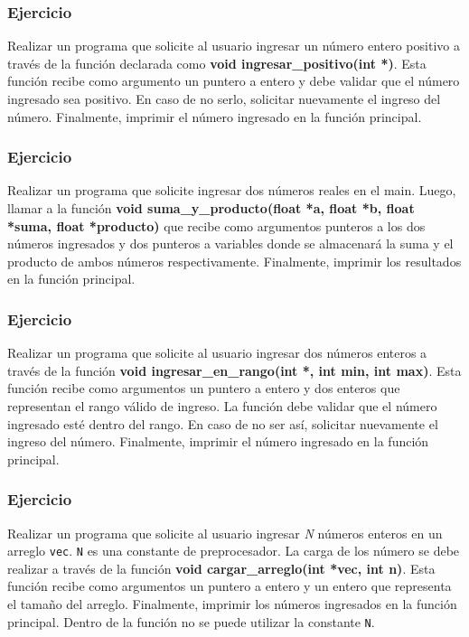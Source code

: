 \subsubsection{Ejercicio}
Realizar un programa que solicite al usuario ingresar un número entero positivo a través de la función declarada como \textbf{void ingresar\_positivo(int *)}. Esta función recibe como argumento un puntero a entero y debe validar que el número ingresado sea positivo. En caso de no serlo, solicitar nuevamente el ingreso del número. Finalmente, imprimir el número ingresado en la función principal. 

\subsubsection{Ejercicio}
Realizar un programa que solicite ingresar dos números reales en el main. Luego, llamar a la función \textbf{void suma\_y\_producto(float *a, float *b, float *suma, float *producto)} que recibe como argumentos punteros a los dos números ingresados y dos punteros a variables donde se almacenará la suma y el producto de ambos números respectivamente. Finalmente, imprimir los resultados en la función principal.

\subsubsection{Ejercicio}
Realizar un programa que solicite al usuario ingresar dos números enteros a través de la función \textbf{void ingresar\_en\_rango(int *, int min, int max)}. Esta función recibe como argumentos un puntero a entero y dos enteros que representan el rango válido de ingreso. La función debe validar que el número ingresado esté dentro del rango. En caso de no ser así, solicitar nuevamente el ingreso del número. Finalmente, imprimir el número ingresado en la función principal.

\subsubsection{Ejercicio}
Realizar un programa que solicite al usuario ingresar \textit{N} números enteros en un arreglo \texttt{vec}. \texttt{N} es una constante de preprocesador. La carga de los número se debe realizar a través de la función \textbf{void cargar\_arreglo(int *vec, int n)}. Esta función recibe como argumentos un puntero a entero y un entero que representa el tamaño del arreglo. Finalmente, imprimir los números ingresados en la función principal. Dentro de la función no se puede utilizar la constante \texttt{N}.

